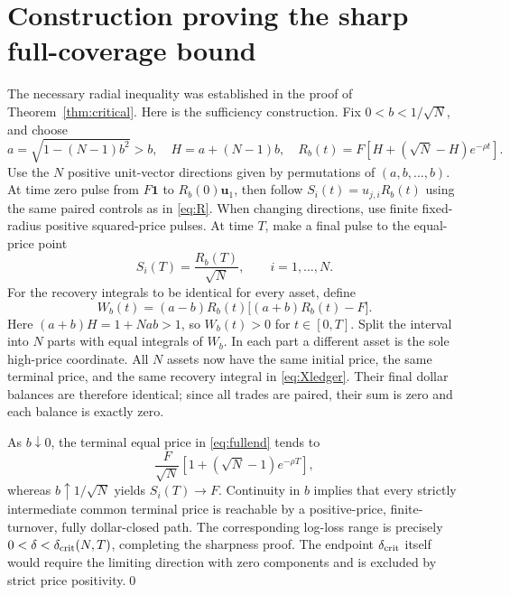\documentclass[11pt]{article}
\numberwithin{equation}{section}
\theoremstyle{definition}
\theoremstyle{remark}
\newcommand{\one}{\mathbf{1}}
\begin{document}
\section{Construction proving the sharp full-coverage bound}\label{app:sharp}
The necessary radial inequality was established in the proof of Theorem~\ref{thm:critical}. Here is the sufficiency construction. Fix $0<b<1/\sqrt N$, and choose
\begin{equation}\label{eq:fullab}
a=\sqrt{1-(N-1)b^2}>b,
\quad H=a+(N-1)b,
\quad R_b(t)=F\left[H+(\sqrt N-H)e^{-\rho t}\right].
\end{equation}
Use the $N$ positive unit-vector directions given by permutations of $(a,b,\ldots,b)$. At time zero pulse from $F\one$ to $R_b(0)\bm u_1$, then follow $S_i(t)=u_{j,i}R_b(t)$ using the same paired controls as in \eqref{eq:R}. When changing directions, use finite fixed-radius positive squared-price pulses. At time $T$, make a final pulse to the equal-price point
\begin{equation}\label{eq:fullend}
S_i(T)=\frac{R_b(T)}{\sqrt N},\qquad i=1,\ldots,N.
\end{equation}
For the recovery integrals to be identical for every asset, define
\begin{equation}\label{eq:fullW}
W_b(t)=(a-b)R_b(t)\big[(a+b)R_b(t)-F\big].
\end{equation}
Here $(a+b)H=1+Nab>1$, so $W_b(t)>0$ for $t\in[0,T]$. Split the interval into $N$ parts with equal integrals of $W_b$. In each part a different asset is the sole high-price coordinate. All $N$ assets now have the same initial price, the same terminal price, and the same recovery integral in \eqref{eq:Xledger}. Their final dollar balances are therefore identical; since all trades are paired, their sum is zero and each balance is exactly zero.

As $b\downarrow0$, the terminal equal price in \eqref{eq:fullend} tends to
\[
\frac{F}{\sqrt N}\left[1+(\sqrt N-1)e^{-\rho T}\right],
\]
whereas $b\uparrow1/\sqrt N$ yields $S_i(T)\to F$. Continuity in $b$ implies that every strictly intermediate common terminal price is reachable by a positive-price, finite-turnover, fully dollar-closed path. The corresponding log-loss range is precisely $0<\delta<\delta_{\rm crit}(N,T)$, completing the sharpness proof. The endpoint $\delta_{\rm crit}$ itself would require the limiting direction with zero components and is excluded by strict price positivity.\qed
\end{document}

